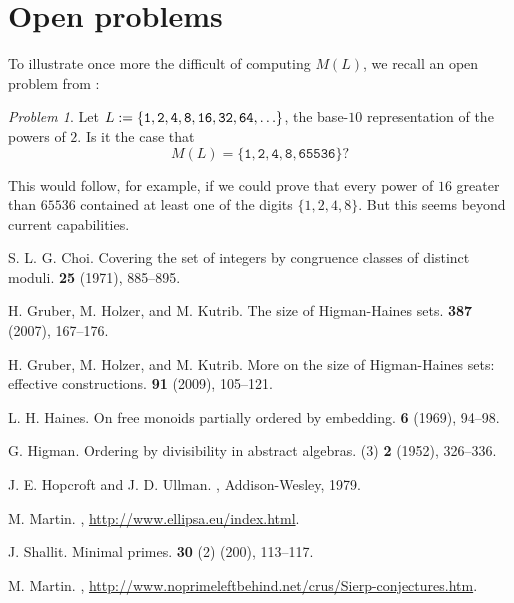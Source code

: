 \documentclass[12pt]{article}
\theoremstyle{plain}
\theoremstyle{definition}
\theoremstyle{remark}
\newtheorem{problem}[theorem]{Problem}
\newcommand{\0}{\mathtt{0}}
\newcommand{\1}{\mathtt{1}}
\newcommand{\2}{\mathtt{2}}
\newcommand{\3}{\mathtt{3}}
\newcommand{\4}{\mathtt{4}}
\newcommand{\5}{\mathtt{5}}
\newcommand{\6}{\mathtt{6}}
\newcommand{\7}{\mathtt{7}}
\newcommand{\8}{\mathtt{8}}
\newcommand{\9}{\mathtt{9}}
\begin{document}
\section{Open problems}

To illustrate once more the difficult of computing $M(L)$, we recall
an open problem from \cite{Sh00}:

\begin{problem} 
Let $L := \lbrace {\tt 1, 2, 4, 8, 16, 32, 64, } \ldots \rbrace$, the
base-$10$ representation of the powers of $2$.  
Is it the case that
$$ M(L) = \lbrace \1, \2, \4, \8, \6\5\5\3\6 \rbrace ? $$
\end{problem}

This would follow, for example, if we could prove that every power
of $16$ greater than $65536$ contained at least one of the digits
$\lbrace 1,2,4, 8 \rbrace$.  But this seems beyond current capabilities.



\begin{thebibliography}{9}

  S. L. G. Choi.
\newblock Covering the set of integers by congruence 
classes of distinct moduli.
 {\bf 25} (1971), 885--895.

  H. Gruber, M. Holzer, and M. Kutrib.
\newblock The size of Higman-Haines sets.
 {\bf 387} (2007), 167--176.

  H. Gruber, M. Holzer, and M. Kutrib.
\newblock More on the size of Higman-Haines sets:  effective constructions.
 {\bf 91} (2009), 105--121.

  L. H. Haines.
\newblock On free monoids partially ordered by embedding.
 {\bf 6} (1969), 94--98.

  G. Higman.
\newblock Ordering by divisibility in abstract algebras.
 (3) {\bf 2} (1952), 326--336.

  J. E. Hopcroft and J. D. Ullman.
,
Addison-Wesley, 1979.

  M. Martin.
,
\url{http://www.ellipsa.eu/index.html}.

  J. Shallit.
\newblock Minimal primes.
 {\bf 30} (2) (200), 113--117.

  M. Martin.
,
\url{http://www.noprimeleftbehind.net/crus/Sierp-conjectures.htm}.

\end{thebibliography}
\end{document}

